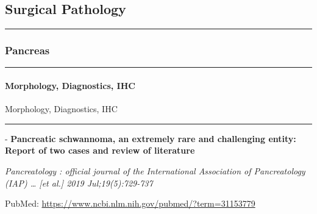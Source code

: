 \documentclass[]{article}
\let\oldparagraph\paragraph
\renewcommand{\paragraph}[1]{\oldparagraph{#1}\mbox{}}
\begin{document}
\pagebreak

\hypertarget{surgical-pathology}{%
\subsection{Surgical Pathology}\label{surgical-pathology}}

\begin{center}\rule{0.5\linewidth}{\linethickness}\end{center}

\hypertarget{pancreas}{%
\subsubsection{Pancreas}\label{pancreas}}

\begin{center}\rule{0.5\linewidth}{\linethickness}\end{center}

\hypertarget{morphology-diagnostics-ihc}{%
\paragraph{Morphology, Diagnostics,
IHC}\label{morphology-diagnostics-ihc}}

Morphology, Diagnostics, IHC

\begin{center}\rule{0.5\linewidth}{\linethickness}\end{center}

 - \textbf{Pancreatic schwannoma, an extremely rare and challenging
entity: Report of two cases and review of literature}

\emph{Pancreatology : official journal of the International Association
of Pancreatology (IAP) \ldots{} {[}et al.{]} 2019 Jul;19(5):729-737}

PubMed: \url{https://www.ncbi.nlm.nih.gov/pubmed/?term=31153779}
\end{document}
